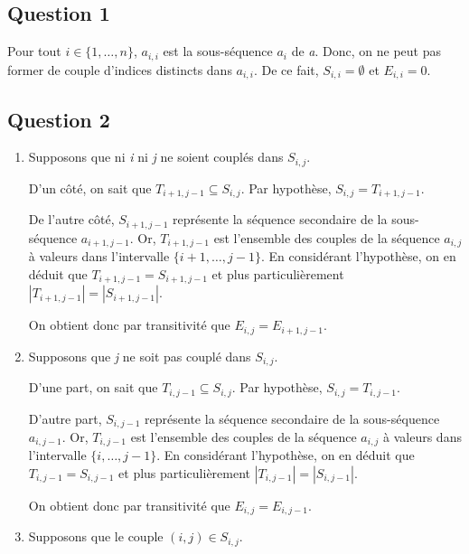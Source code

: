 \documentclass[12pt,a4paper]{article}
\begin{document}
\subsection{Question 1}
Pour tout \( i \in \{1, \dotsc, n\} \), \( a_{i,i} \) est la sous-s\'equence \( a_i \) de {\itshape a}. Donc, on ne peut pas former de couple d'indices distincts dans \( a_{i,i} \). De ce fait, \( S_{i,i} = \emptyset \) et \( E_{i,i} = 0\).

\subsection{Question 2}
\begin{enumerate}
	\item Supposons que ni {\itshape i} ni {\itshape j} ne soient coupl\'es dans \( S_{i,j} \).
	
	D'un c\^ot\'e, on sait que $T_{i+1,j-1} \subseteq S_{i,j}$. Par hypoth\`ese, \( S_{i,j} = T_{i+1,j-1} \).%
	
	De l'autre c\^ot\'e, $S_{i+1,j-1}$ repr\'esente la s\'equence secondaire de la sous-s\'equence $a_{i+1,j-1}$. Or, \( T_{i+1,j-1} \) est l'ensemble des couples de la s\'equence $a_{i,j}$ \`a valeurs dans l'intervalle $\{i+1,\dotsc,j-1\}$. En consid\'erant l'hypoth\`ese, on en d\'eduit que $T_{i+1,j-1} = S_{i+1,j-1}$ et plus particuli\`erement $|T_{i+1,j-1}| = |S_{i+1,j-1}|$.
	
	On obtient donc par transitivit\'e que $E_{i,j} = E_{i+1,j-1}$.
	
	\item Supposons que {\itshape j} ne soit pas coupl\'e dans \( S_{i,j} \).
	
	D'une part, on sait que $T_{i,j-1} \subseteq S_{i,j}$. Par hypoth\`ese, \( S_{i,j} = T_{i,j-1} \). 
	
	D'autre part, $S_{i,j-1}$ repr\'esente la s\'equence secondaire de la sous-s\'equence $a_{i,j-1}$. Or, \( T_{i,j-1} \) est l'ensemble des couples de la s\'equence $a_{i,j}$ \`a valeurs dans l'intervalle $\{i,\dotsc,j-1\}$. En consid\'erant l'hypoth\`ese, on en d\'eduit que $T_{i,j-1} = S_{i,j-1}$ et plus particuli\`erement $|T_{i,j-1}| = |S_{i,j-1}|$.
	
	On obtient donc par transitivit\'e que $E_{i,j} = E_{i,j-1}$.
	
	\item Supposons que le couple \( (i,j) \in S_{i,j} \).
	

\end{enumerate}
\end{document}
